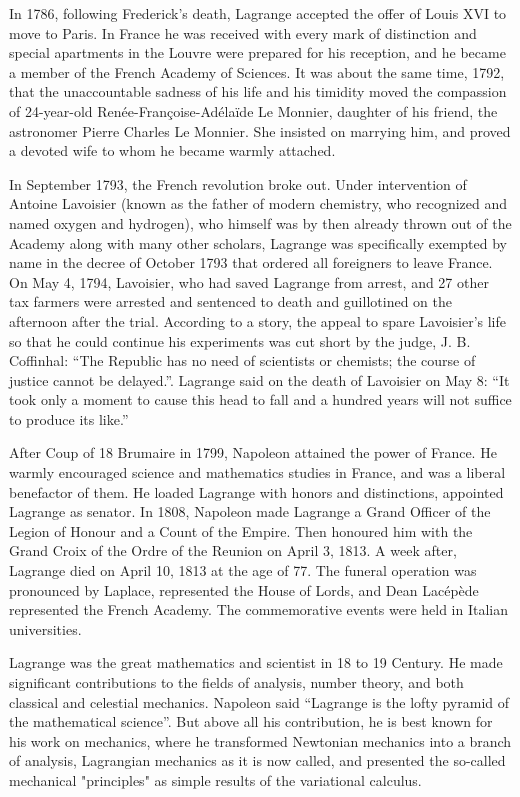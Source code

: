 \documentclass{article}
\begin{document}
In 1786, following Frederick's death, Lagrange accepted the offer of Louis XVI to move to Paris. In France he was received with every mark of distinction and special apartments in the Louvre were prepared for his reception, and he became a member of the French Academy of Sciences. It was about the same time, 1792, that the unaccountable sadness of his life and his timidity moved the compassion of 24-year-old Renée-Françoise-Adélaïde Le Monnier, daughter of his friend, the astronomer Pierre Charles Le Monnier. She insisted on marrying him, and proved a devoted wife to whom he became warmly attached.

In September 1793, the French revolution broke out. Under intervention of Antoine Lavoisier (known as the father of modern chemistry, who recognized and named oxygen and hydrogen), who himself was by then already thrown out of the Academy along with many other scholars, Lagrange was specifically exempted by name in the decree of October 1793 that ordered all foreigners to leave France. On May 4, 1794, Lavoisier, who had saved Lagrange from arrest, and 27 other tax farmers were arrested and sentenced to death and guillotined on the afternoon after the trial. According to a story, the appeal to spare Lavoisier's life so that he could continue his experiments was cut short by the judge, J. B. Coffinhal: ``The Republic has no need of scientists or chemists; the course of justice cannot be delayed.''. Lagrange said on the death of Lavoisier on May 8: ``It took only a moment to cause this head to fall and a hundred years will not suffice to produce its like.''\cite{Wiki-Lagrange}

After Coup of 18 Brumaire in 1799, Napoleon attained the power of France. He warmly encouraged science and mathematics studies in France, and was a liberal benefactor of them. He loaded Lagrange with honors and distinctions, appointed Lagrange as senator. In 1808, Napoleon made Lagrange a Grand Officer of the Legion of Honour and a Count of the Empire. Then honoured him with the Grand Croix of the Ordre of the Reunion on April 3, 1813. A week after, Lagrange died on April 10, 1813 at the age of 77. The funeral operation was pronounced by Laplace, represented the House of Lords, and Dean Lacépède represented the French Academy. The commemorative events were held in Italian universities.

Lagrange was the great mathematics and scientist in 18 to 19 Century. He made significant contributions to the fields of analysis, number theory, and both classical and celestial mechanics. Napoleon said ``Lagrange is the lofty pyramid of the mathematical science''. But above all his contribution, he is best known for his work on mechanics, where he transformed Newtonian mechanics into a branch of analysis, Lagrangian mechanics as it is now called, and presented the so-called mechanical "principles" as simple results of the variational calculus.
\end{document}
